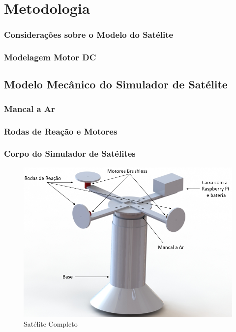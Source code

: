 \chapter{Metodologia}

\subsection{Considerações sobre o Modelo do Satélite}

\subsection{Modelagem Motor DC}

\section{Modelo Mecânico do Simulador de Satélite}

\subsection{Mancal a Ar}

\subsection{Rodas de Reação e Motores}

\subsection{Corpo do Simulador de Satélites}

\begin{figure}[!ht]
  \caption{Satélite Completo}
  \begin{center}
      \includegraphics[scale=.75]{img/satelite_completo}
  \end{center}
  \label{fig:pid_neural_Applying_p18}
\end{figure}

